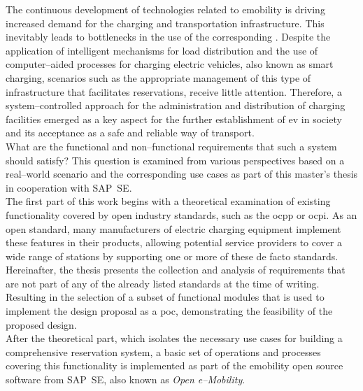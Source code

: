 

\Abstract
The continuous development of technologies related to \acrfull{emobility} is driving increased demand for the charging and transportation infrastructure. This inevitably leads to bottlenecks in the use of the corresponding .
Despite the application of intelligent mechanisms for load distribution and the use of computer--aided processes for charging electric vehicles, also known as smart charging, scenarios such as the appropriate management of this type of infrastructure that facilitates reservations, receive little attention. 
Therefore, a system--controlled approach for the administration and distribution of charging facilities emerged as a key aspect for the further establishment of \acrfull{ev} in society and its acceptance as a safe and reliable way of transport.\\
What are the functional and non--functional requirements that such a system should satisfy? This question is examined from various perspectives based on a real--world scenario and the corresponding use cases as part of this master's thesis in cooperation with SAP~SE.\\
The first part of this work begins with a theoretical examination of existing functionality covered by open industry standards, such as the \acrfull{ocpp} or \acrfull{ocpi}. 
As an open standard, many manufacturers of electric charging equipment implement these features in their products, allowing potential service providers to cover a wide range of stations by supporting one or more of these de facto standards.
Hereinafter, the thesis presents the collection and analysis of requirements that are not part of any of the already listed standards at the time of writing. 
Resulting in the selection of a subset of functional modules that is used to implement the design proposal as a \acrfull{poc}, demonstrating the feasibility of the proposed design.\\
After the theoretical part, which isolates the necessary use cases for building a comprehensive reservation system, a basic set of operations and processes covering this functionality is implemented as part of the \acrshort{emobility} open source software from SAP~SE, also known as \textit{Open e--Mobility}.
